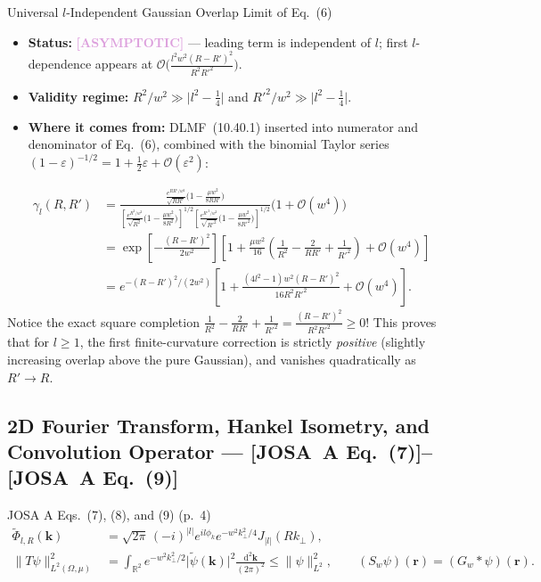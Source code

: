 \documentclass[10pt,letterpaper]{article}
\newcommand{\norm}[1]{\lVert #1 \rVert}
\newcommand{\abs}[1]{\lvert #1 \rvert}
\newcommand{\dd}{\mathrm{d}}
\newcommand{\josa}[1]{\textbf{[JOSA~A Eq.~(#1)]}}
\newcommand{\tagasymp}{\textcolor{plum}{\textbf{[ASYMPTOTIC]}}}
\numberwithin{equation}{section}
\begin{document}
\begin{approxbox}{Universal $l$-Independent Gaussian Overlap Limit of Eq.~(6)}
\begin{itemize}[leftmargin=1.4em,itemsep=2pt,topsep=1pt]
  \item \textbf{Status:} \tagasymp{} --- leading term is independent of $l$; first $l$-dependence appears at $\mathcal{O}\bigl(\frac{l^2 w^2 (R-R')^2}{R^2 R'^2}\bigr)$.
  \item \textbf{Validity regime:} $R^2/w^2 \gg \abs{l^2 - \frac{1}{4}}$ and $R'^2/w^2 \gg \abs{l^2 - \frac{1}{4}}$.
  \item \textbf{Where it comes from:} DLMF~(10.40.1) inserted into numerator and denominator of Eq.~(6), combined with the binomial Taylor series $(1 - \varepsilon)^{-1/2} = 1 + \frac{1}{2}\varepsilon + \mathcal{O}(\varepsilon^2)$:
\end{itemize}
\vspace{-4pt}
\begin{align*}
  \gamma_l(R,R') &= \frac{\frac{e^{RR'/w^2}}{\sqrt{RR'}}\bigl(1 - \frac{\mu w^2}{8RR'}\bigr)}{\left[\frac{e^{R^2/w^2}}{\sqrt{R^2}}\bigl(1 - \frac{\mu w^2}{8R^2}\bigr)\right]^{1/2}\left[\frac{e^{R'^2/w^2}}{\sqrt{R'^2}}\bigl(1 - \frac{\mu w^2}{8R'^2}\bigr)\right]^{1/2}}\bigl(1 + \mathcal{O}(w^4)\bigr) \\
  &= \exp\!\left[-\frac{(R-R')^2}{2w^2}\right]\left[1 + \frac{\mu w^2}{16}\left(\frac{1}{R^2} - \frac{2}{RR'} + \frac{1}{R'^2}\right) + \mathcal{O}(w^4)\right] \\
  &= e^{-(R-R')^2/(2w^2)}\left[1 + \frac{(4l^2-1)w^2(R-R')^2}{16 R^2 R'^2} + \mathcal{O}(w^4)\right].
\end{align*}
Notice the exact square completion $\frac{1}{R^2} - \frac{2}{RR'} + \frac{1}{R'^2} = \frac{(R-R')^2}{R^2 R'^2} \ge 0$! This proves that for $l \ge 1$, the first finite-curvature correction is strictly \emph{positive} (slightly increasing overlap above the pure Gaussian), and vanishes quadratically as $R' \to R$.
\end{approxbox}

\subsection{2D Fourier Transform, Hankel Isometry, and Convolution Operator --- \josa{7}--\josa{9}}

\begin{targeteq}{JOSA A Eqs.~(7), (8), and (9) (p.~4)}
\begin{align*}
  \widetilde{\Phi}_{l,R}(\mathbf{k}) &= \sqrt{2\pi}\,(-i)^{\abs{l}} e^{il\phi_k} e^{-w^2 k_\perp^2/4} J_{\abs{l}}(Rk_\perp), \\
  \norm{T\psi}_{L^2(\Omega,\mu)}^2 &= \int_{\mathbb{R}^2} e^{-w^2 k_\perp^2/2}\abs{\widetilde{\psi}(\mathbf{k})}^2\frac{\dd^2\mathbf{k}}{(2\pi)^2} \le \norm{\psi}_{L^2}^2, \qquad (S_w\psi)(\mathbf{r}) = (G_w * \psi)(\mathbf{r}).
\end{align*}
\end{targeteq}
\end{document}
